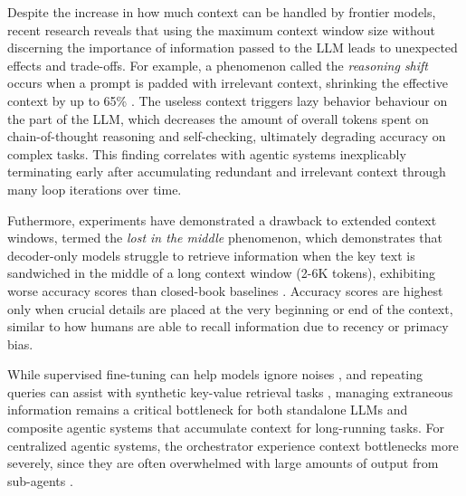 \documentclass[conference]{IEEEtran}
\begin{document}
Despite the increase in how much context can be handled by frontier models, recent research reveals
that using the maximum context window size without discerning the importance of information passed
to the LLM leads to unexpected effects and trade-offs.
For example, a phenomenon called the \emph{reasoning shift} occurs when a prompt is
padded with irrelevant context, shrinking the effective context by up to 65\% \cite{rodionov_reasoning_2026}.
The useless context triggers lazy behavior behaviour on the part of the LLM, which decreases the
amount of overall tokens spent on chain-of-thought reasoning and self-checking,
ultimately degrading accuracy on complex tasks.
This finding correlates with agentic systems inexplicably terminating early after
accumulating redundant and irrelevant context through many loop iterations over time.

Futhermore, experiments have demonstrated a drawback to extended context windows, termed
the \emph{lost in the middle} phenomenon, which demonstrates that decoder-only models struggle
to retrieve information when the key text is sandwiched 
in the middle of a long context window (2-6K tokens),
exhibiting worse accuracy scores than closed-book baselines \cite{liu_lost_nodate}.
Accuracy scores are highest only when crucial details are placed at the very beginning or end of the
context, similar to how humans are able to recall information due to recency or primacy bias.

While supervised fine-tuning can help models ignore noises \cite{rodionov_reasoning_2026},
and repeating queries can assist with synthetic key-value retrieval tasks \cite{liu_lost_nodate},
managing extraneous information remains a critical bottleneck for both standalone LLMs and composite
agentic systems that accumulate context for long-running tasks.
For centralized agentic systems, the orchestrator experience context bottlenecks more severely,
since they are often overwhelmed with large amounts of output from sub-agents \cite{patel_dynamic_2026}.
\end{document}
